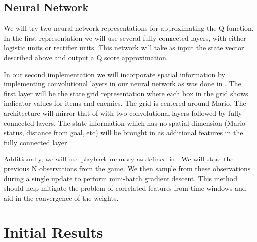 \documentclass[12pt]{article}
\begin{document}
\subsection{Neural Network}

We will try two neural network representations for approximating the Q function. In the first representation we will use several fully-connected layers, with either logistic units or rectifier units. This network will take as input the state vector described above and output a Q score approximation.

In our second implementation we will incorporate spatial information by implementing convolutional layers in our neural network as was done in \cite{mnih}. The first layer will be the state grid representation where each box in the grid shows indicator values for items and enemies. The grid is centered around Mario. The architecture will mirror that of \cite{mnih} with two convolutional layers followed by fully connected layers. The state information which has no spatial dimension (Mario status, distance from goal, etc) will be brought in as additional features in the fully connected layer.

Additionally, we will use playback memory as defined in \cite{mnih}. We will store the previous N observations from the game. We then sample from these observations during a single update to perform mini-batch gradient descent. This method should help mitigate the problem of correlated features from time windows and aid in the convergence of the weights.

\section{Initial Results}
\end{document}
